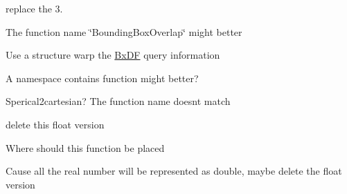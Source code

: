 
\begin{DoxyRefList}
\item[Member \mbox{\hyperlink{class_angle_adcf3b9ce618ebfc8fb83d2c2089afa2f}{Angle\+::Angle}} (double v, Angle\+Type type)]\label{todo__todo000006}%
%
replace the 3.  
\item[Member \mbox{\hyperlink{_bounding_box_8h_aa8342387fe8fb82925e302ba0342a632}{Bounding\+Box\+Union\+Intersect}} (const Bounding\+Box3$<$ Base\+Type $>$ \&b1, const Bounding\+Box3$<$ Base\+Type $>$ \&b2)]\label{todo__todo000002}%
%
The function name \char`\"{}\+Bounding\+Box\+Overlap\char`\"{} might better  
\item[Class \mbox{\hyperlink{class_bx_d_f}{Bx\+DF}} ]\label{todo__todo000014}%
%
Use a structure warp the \mbox{\hyperlink{class_bx_d_f}{Bx\+DF}} query information  
\item[Class \mbox{\hyperlink{class_coord_convertor}{Coord\+Convertor}} ]\label{todo__todo000003}%
%
A namespace contains function might better?  
\item[Member \mbox{\hyperlink{class_coord_convertor_a6f5154f84a5ed35b8602d27f4b7d3450}{Coord\+Convertor\+::cartesian2\+Spherical}} (const Point2d \&p)]\label{todo__todo000004}%
%
Sperical2cartesian? The function name doesn\textquotesingle{}t match  
\item[Member \mbox{\hyperlink{_common_8h_aa4bc628102111f721c678c58c1d81aa1}{fresnel}} (float cos\+ThetaI, float ext\+IOR, float int\+IOR)]\label{todo__todo000008}%
%
delete this float version  
\item[Member \mbox{\hyperlink{_common_8h_a2ad2c6c590e48dd021738bd29c0dbae8}{fresnel}} (double cos\+ThetaI, double ext\+IOR, double int\+IOR)]\label{todo__todo000009}%
%
Where should this function be placed  
\item[Module \mbox{\hyperlink{group___geometry}{Geometry}} ]\label{todo__todo000005}%
%
Cause all the real number will be represented as double, maybe delete the float version ~\newline
  

\end{DoxyRefList}
